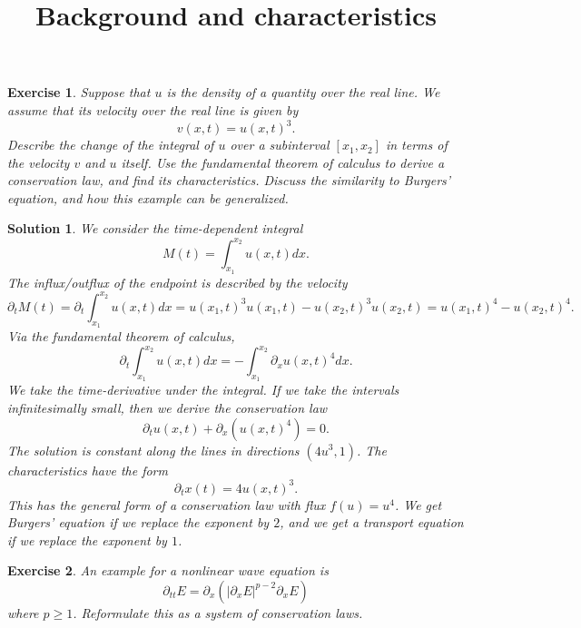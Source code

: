 \documentclass[10pt,letterpaper]{article}
\title{Background and characteristics}
\date{}
\theoremstyle{break}
\newtheorem{exercise}{Exercise}
\newtheorem{solution}{Solution}
\begin{document}
\maketitle



\begin{exercise}
    Suppose that $u$ is the density of a quantity over the real line.
    We assume that its velocity over the real line is given by
    $$
        v(x,t) = u(x,t)^3.
    $$
    Describe the change of the integral of $u$ over a subinterval $[x_1,x_2]$ in terms of the velocity $v$ and $u$ itself. Use the fundamental theorem of calculus to derive a conservation law, and find its characteristics. 
    Discuss the similarity to Burgers' equation, and how this example can be generalized.
\end{exercise}

\begin{solution}
    We consider the time-dependent integral 
    $$
        M(t) = \int_{x_1}^{x_2} u(x,t) dx.
    $$
    The influx/outflux of the endpoint is described by the velocity 
    $$
        \partial_t M(t) 
        =
        \partial_t \int_{x_1}^{x_2} u(x,t) dx
        =
        u(x_1,t)^3 u(x_1,t) - u(x_2,t)^3 u(x_2,t) 
        =
        u(x_1,t)^4 - u(x_2,t)^4 
        .
    $$
    Via the fundamental theorem of calculus,
    $$
        \partial_t \int_{x_1}^{x_2} u(x,t) dx
        =
        - \int_{x_1}^{x_2} \partial_x u(x,t)^4 dx
        .
    $$
    We take the time-derivative under the integral. 
    If we take the intervals infinitesimally small, then we derive the conservation law
    $$
        \partial_t u(x,t)
        +
        \partial_x \left( u(x,t)^4 \right)
        =
        0
        .
    $$
    The solution is constant along the lines in directions $(4u^3,1)$.
    The characteristics have the form 
    $$
        \partial_t x(t) = 4u(x,t)^3.
    $$
    This has the general form of a conservation law with flux $f(u) = u^4$.
    We get Burgers' equation if we replace the exponent by $2$,
    and we get a transport equation if we replace the exponent by $1$.
\end{solution}





\begin{exercise}
    An example for a nonlinear wave equation is
    $$
        \partial_{tt} E = \partial_{x} \left( |\partial_x E|^{p-2} \partial_x E \right)
    $$
    where $p \geq 1$. Reformulate this as a system of conservation laws.
\end{exercise}
\end{document}
